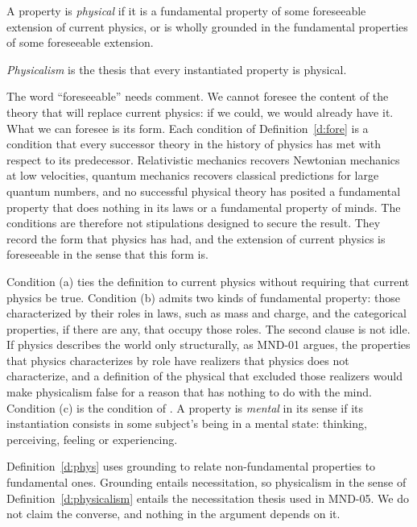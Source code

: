 \documentclass{situationist-preprint}
\begin{document}
\begin{definition}\label{d:phys}
A property is \emph{physical} if it is a fundamental property of some foreseeable extension of current physics, or is wholly grounded in the fundamental properties of some foreseeable extension.
\end{definition}

\begin{definition}[Physicalism]\label{d:physicalism}
\emph{Physicalism} is the thesis that every instantiated property is physical.
\end{definition}

The word \enquote{foreseeable} needs comment. We cannot foresee the content of the theory that will replace current physics: if we could, we would already have it. What we can foresee is its form. Each condition of Definition~\ref{d:fore} is a condition that every successor theory in the history of physics has met with respect to its predecessor. Relativistic mechanics recovers Newtonian mechanics at low velocities, quantum mechanics recovers classical predictions for large quantum numbers, and no successful physical theory has posited a fundamental property that does nothing in its laws or a fundamental property of minds. The conditions are therefore not stipulations designed to secure the result. They record the form that physics has had, and the extension of current physics is foreseeable in the sense that this form is.

Condition (a) ties the definition to current physics without requiring that current physics be true. Condition (b) admits two kinds of fundamental property: those characterized by their roles in laws, such as mass and charge, and the categorical properties, if there are any, that occupy those roles. The second clause is not idle. If physics describes the world only structurally, as MND-01 argues, the properties that physics characterizes by role have realizers that physics does not characterize, and a definition of the physical that excluded those realizers would make physicalism false for a reason that has nothing to do with the mind. Condition (c) is the condition of \citet{Wilson2006}. A property is \emph{mental} in its sense if its instantiation consists in some subject's being in a mental state: thinking, perceiving, feeling or experiencing.

Definition~\ref{d:phys} uses grounding to relate non-fundamental properties to fundamental ones. Grounding entails necessitation, so physicalism in the sense of Definition~\ref{d:physicalism} entails the necessitation thesis used in MND-05. We do not claim the converse, and nothing in the argument depends on it.
\end{document}
